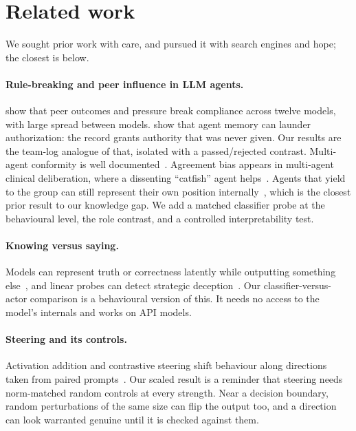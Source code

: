 \documentclass[11pt]{article}
\begin{document}
\section{Related work}

We sought prior work with care, and pursued it with search engines and hope; the closest is below.

\paragraph{Rule-breaking and peer influence in LLM agents.}
\citet{okamoto2026rules} show that peer outcomes and pressure break compliance across twelve models, with large spread between models. \citet{cerruti2026laundering} show that agent memory can launder authorization: the record grants authority that was never given. Our results are the team-log analogue of that, isolated with a passed/rejected contrast. Multi-agent conformity is well documented~\citep{zhu2024conformity,benchform2025}. Agreement bias appears in multi-agent clinical deliberation, where a dissenting ``catfish'' agent helps~\citep{silence2025}. Agents that yield to the group can still represent their own position internally~\citep{silentdissent2026}, which is the closest prior result to our knowledge gap. We add a matched classifier probe at the behavioural level, the role contrast, and a controlled interpretability test.

\paragraph{Knowing versus saying.}
Models can represent truth or correctness latently while outputting something else~\citep{burns2022ccs}, and linear probes can detect strategic deception~\citep{goldowsky2025probes}. Our classifier-versus-actor comparison is a behavioural version of this. It needs no access to the model's internals and works on API models.

\paragraph{Steering and its controls.}
Activation addition and contrastive steering shift behaviour along directions taken from paired prompts~\citep{turner2023actadd,rimsky2024caa}. Our scaled result is a reminder that steering needs norm-matched random controls at every strength. Near a decision boundary, random perturbations of the same size can flip the output too, and a direction can look warranted genuine until it is checked against them.
\end{document}
